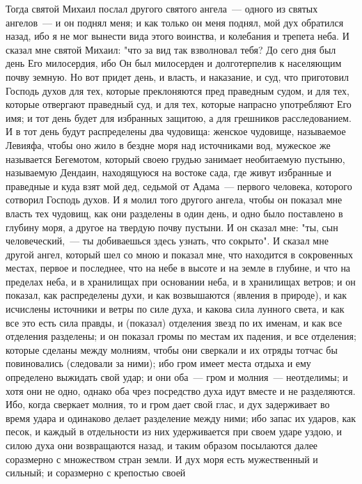 Тогда святой Михаил послал другого святого ангела~--- одного из святых
ангелов~--- и он поднял меня; и как только он меня поднял, мой дух обратился
назад, ибо я не мог вынести вида этого воинства, и колебания и трепета неба.
И сказал мне святой Михаил: "что за вид так взволновал тебя?
До сего дня был день Его милосердия, ибо Он был милосерден и
долготерпелив к населяющим почву земную.
Но вот придет день, и власть, и наказание, и суд, что приготовил
Господь духов для тех, которые преклоняются пред праведным судом, и для тех,
которые отвергают праведный суд, и для тех, которые напрасно употребляют Его
имя; и тот день будет для избранных защитою, а для грешников расследованием.
И в тот день будут распределены два чудовища: женское чудовище,
называемое Левияфа, чтобы оно жило в бездне моря над источниками вод, мужеское
же называется Бегемотом, который своею грудью занимает необитаемую пустыню,
называемую Дендаин, находящуюся на востоке сада, где живут избранные и
праведные и куда взят мой дед, седьмой от Адама~--- первого человека, которого
сотворил Господь духов.
И я молил того другого ангела, чтобы он показал мне власть тех
чудовищ, как они разделены в один день, и одно было поставлено в глубину моря,
а другое на твердую почву пустыни.
И он сказал мне: "ты, сын человеческий,~--- ты добиваешься здесь узнать,
что сокрыто".
И сказал мне другой ангел, который шел со мною и показал мне, что
находится в сокровенных местах, первое и последнее, что на небе в высоте и на
земле в глубине, и что на пределах неба, и в хранилищах при основании неба, и в
хранилищах ветров; и он показал, как распределены духи, и как возвышаются
(явления в природе), и как исчислены источники и ветры по силе духа, и какова
сила лунного света, и как все это есть сила правды, и (показал) отделения звезд
по их именам, и как все отделения разделены; и он показал громы по местам их
падения, и все отделения; которые сделаны между молниям, чтобы они сверкали и
их отряды тотчас бы повиновались (следовали за ними); ибо гром имеет места
отдыха и ему определено выжидать свой удар; и они оба~--- гром и молния~---
неотделимы; и хотя они не одно, однако оба чрез посредство духа идут вместе и
не разделяются.
Ибо, когда сверкает молния, то и гром дает свой глас, и дух
задерживает во время удара и одинаково делает разделение между ними; ибо запас
их ударов, как песок, и каждый в отдельности из них удерживается при своем
ударе уздою, и силою духа они возвращаются назад, и таким образом посылаются
далее соразмерно с множеством стран земли.
И дух моря есть мужественный и сильный; и соразмерно с крепостью своей
